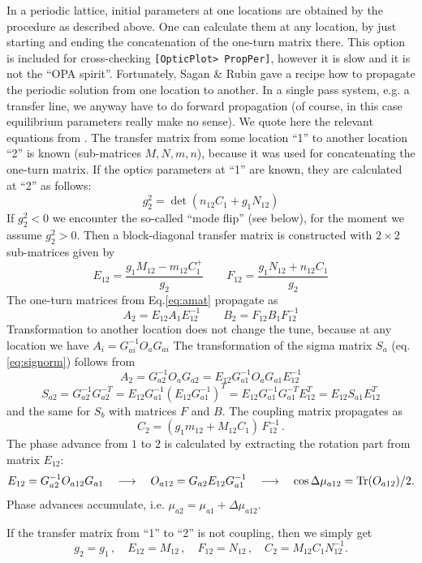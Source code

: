 \documentclass[12pt]{article}
\newcommand\beq{\begin{equation}}
\newcommand\eeq{\end{equation}}
\newcommand{\Tr}{{\rm Tr}}
\newcommand\code[1]{{\tt [#1]}}
\begin{document}
In a periodic lattice, initial parameters at one locations are obtained by the procedure as described above. One can calculate them at any location, by just starting and ending the concatenation of the one-turn matrix there. This option is included for cross-checking \code{OpticPlot> PropPer}, however it is slow and it is not the ``OPA spirit''.
Fortunately, Sagan \& Rubin gave a recipe \cite{SAGAN} how to propagate the periodic solution from one location to another.
In a single pass system, e.g. a transfer line, we anyway have to do forward propagation (of course, in this case equilibrium parameters really make no sense).
We quote here the relevant equations from \cite{SAGAN}. The transfer matrix from some location ``1'' to another location ``2'' is known (sub-matrices $M,N,m,n$), because it was used for concatenating the one-turn matrix. If the optics parameters at ``1'' are known, they are calculated at ``2'' as follows:
\beq\label{eq:g2noflip}
g_2^2=\det (n_{12} C_1+g_1 N_{12})
\eeq
If $g_2^2<0$ we encounter the so-called ``mode flip'' (see below), for the moment we assume $g_2^2>0$. Then a block-diagonal transfer matrix is constructed with $2\times 2$ sub-matrices given by
\beq
E_{12}=\frac{g_1M_{12}-m_{12}C_1^+}{g_2}\qquad
F_{12}=\frac{g_1N_{12}+n_{12}C_1}{g_2}
\eeq
The one-turn matrices from Eq.\ref{eq:amat} propagate as
\beq
A_2=E_{12}A_1 E_{12}^{-1}\qquad  B_2=F_{12}B_1 F_{12}^{-1}
\eeq
Transformation to another location does not change the tune, because at any location we have
$A_i = {G}_{ai}^{-1} {O}_a {G}_{ai}$
The transformation of the sigma matrix $S_a$ (eq.\ref{eq:signorm}) follows from
\beq
A_2 = {G}_{a2}^{-1} {O}_a {G}_{a2} = E_{12} {G}_{a1}^{-1} {O}_a {G}_{a1} E_{12}^{-1}
\eeq
\beq
S_{a2} =  {G}_{a2}^{-1} {G}_{a2}^{-T}
= E_{12} {G}_{a1}^{-1} (E_{12} {G}_{a1}^{-1})^T
=E_{12} {G}_{a1}^{-1} {G}_{a1}^{-T} E_{12}^T = E_{12} S_{a1} E_{12}^T
\eeq
and the same for $S_b$ with matrices $F$ and ${B}$.
The coupling matrix propagates as
\beq
C_2=(g_1m_{12}+M_{12}C_1)\,F_{12}^{-1}\, .
\eeq
The phase advance from $1$ to $2$ is calculated by extracting the rotation part from matrix $E_{12}$:
\beq
E_{12} = {G}_{a2}^{-1} {O}_{a12} {G}_{a1}\quad\longrightarrow\quad
{O}_{a12} = {G}_{a2} E_{12} {G}_{a1}^{-1} \quad\longrightarrow\quad \cos\Delta\mu_{a12}={\Tr}({O}_{a12})/2.
\eeq
Phase advances accumulate, i.e. $\mu_{a2}=\mu_{a1}+\Delta\mu_{a12}$.

If the transfer matrix from ``1'' to ``2'' is not coupling, then we simply get
\beq
g_2=g_1\,,\quad E_{12}=M_{12}\,, \quad  F_{12}=N_{12}\,, \quad C_2=M_{12}C_1N_{12}^{-1}.
\eeq
\\
\end{document}
